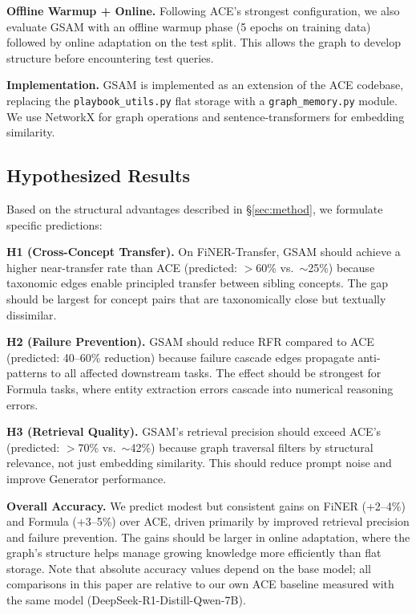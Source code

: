\documentclass[12pt,a4paper]{article}
\begin{document}
\textbf{Offline Warmup + Online.} Following ACE's strongest configuration, we also evaluate GSAM with an offline warmup phase (5 epochs on training data) followed by online adaptation on the test split. This allows the graph to develop structure before encountering test queries.

\textbf{Implementation.} GSAM is implemented as an extension of the ACE codebase, replacing the \texttt{playbook\_utils.py} flat storage with a \texttt{graph\_memory.py} module. We use NetworkX for graph operations and sentence-transformers for embedding similarity.

\subsection{Hypothesized Results}
\label{sec:hypotheses}

Based on the structural advantages described in \S\ref{sec:method}, we formulate specific predictions:

\textbf{H1 (Cross-Concept Transfer).} On FiNER-Transfer, GSAM should achieve a higher near-transfer rate than ACE (predicted: $>$60\% vs.\ $\sim$25\%) because taxonomic edges enable principled transfer between sibling concepts. The gap should be largest for concept pairs that are taxonomically close but textually dissimilar.

\textbf{H2 (Failure Prevention).} GSAM should reduce RFR compared to ACE (predicted: 40--60\% reduction) because failure cascade edges propagate anti-patterns to all affected downstream tasks. The effect should be strongest for Formula tasks, where entity extraction errors cascade into numerical reasoning errors.

\textbf{H3 (Retrieval Quality).} GSAM's retrieval precision should exceed ACE's (predicted: $>$70\% vs.\ $\sim$42\%) because graph traversal filters by structural relevance, not just embedding similarity. This should reduce prompt noise and improve Generator performance.

\textbf{Overall Accuracy.} We predict modest but consistent gains on FiNER (+2--4\%) and Formula (+3--5\%) over ACE, driven primarily by improved retrieval precision and failure prevention. The gains should be larger in online adaptation, where the graph's structure helps manage growing knowledge more efficiently than flat storage. Note that absolute accuracy values depend on the base model; all comparisons in this paper are relative to our own ACE baseline measured with the same model (DeepSeek-R1-Distill-Qwen-7B).
\end{document}
